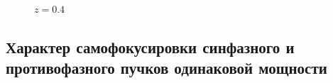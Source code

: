 \documentclass[fullscreen=true,unicode,bookmarks=true]{beamer}
\begin{document}
\begin{frame}
\begin{figure}[H]
\begin{center}
\begin{minipage}[h]{0.24\linewidth}
                    \end{minipage}
                    \hfill
                    \begin{minipage}[h]{0.24\linewidth}
                         \\ \footnotesize{$z=0.4$} \\
                    \end{minipage}
                \end{center}
            \end{figure}
    \end{frame}

	\subsection{Характер самофокусировки синфазного и противофазного пучков одинаковой мощности}
\end{document}
